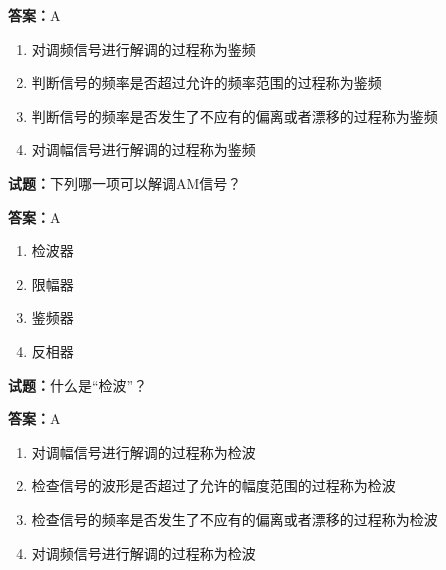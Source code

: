 \documentclass{ctexbook}
\begin{document}
\textbf{答案：}A 

\begin{enumerate}[leftmargin=3em]
  \item 对调频信号进行解调的过程称为鉴频 

  \item 判断信号的频率是否超过允许的频率范围的过程称为鉴频 

  \item 判断信号的频率是否发生了不应有的偏离或者漂移的过程称为鉴频 

  \item 对调幅信号进行解调的过程称为鉴频 

\end{enumerate}





\vspace{1em}

\textbf{试题：}下列哪一项可以解调AM信号？ 

\textbf{答案：}A 

\begin{enumerate}[leftmargin=3em]
  \item 检波器 

  \item 限幅器 

  \item 鉴频器 

  \item 反相器 

\end{enumerate}






\vspace{1em}

\textbf{试题：}什么是“检波”？ 

\textbf{答案：}A 

\begin{enumerate}[leftmargin=3em]
  \item 对调幅信号进行解调的过程称为检波 

  \item 检查信号的波形是否超过了允许的幅度范围的过程称为检波 

  \item 检查信号的频率是否发生了不应有的偏离或者漂移的过程称为检波 

  \item 对调频信号进行解调的过程称为检波 

\end{enumerate}
\end{document}

